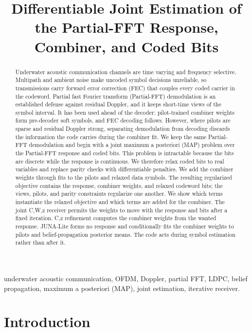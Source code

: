 \documentclass[conference]{IEEEtran}
\title{Differentiable Joint Estimation of the Partial-FFT Response,
Combiner, and Coded Bits}
\author{\IEEEauthorblockN{Gabriel Chua Yu Han}}
\begin{document}
\maketitle

\begin{abstract}
Underwater acoustic communication channels are time varying and frequency
selective.  Multipath and ambient noise make uncoded symbol decisions
unreliable, so transmissions carry forward error correction (FEC) that
couples every coded carrier in the codeword.  Partial fast Fourier transform
(Partial-FFT) demodulation is an established defense against residual Doppler,
and it keeps short-time views of the symbol interval.  It has been used
ahead of the decoder: pilot-trained combiner weights form pre-decoder soft
symbols, and FEC decoding follows.  However, where
pilots are sparse and residual Doppler strong, separating demodulation from
decoding discards the information the code carries during the combiner fit.
We keep the same Partial-FFT demodulation and begin with a joint maximum a
posteriori (MAP) problem over the Partial-FFT response and coded bits.  This
problem is intractable because the bits are discrete while the response is
continuous.  We therefore relax coded bits to real variables and replace
parity checks with differentiable penalties.  We add the combiner weights
through fits to the pilots and relaxed data symbols.  The resulting regularized
objective contains the response, combiner weights, and relaxed codeword bits;
the views, pilots, and parity constraints regularize one another.  We show
which terms instantiate the relaxed objective and which terms are added for
the combiner.  The joint C,W,z receiver permits the weights to move with the
response and bits after a fixed iteration.  C,z refinement computes the
combiner weights from the wanted response.  JUNA-Lite forms no response and
conditionally fits the combiner weights to pilots and belief-propagation
posterior means.  The code acts during symbol estimation rather than after it.
\end{abstract}

\begin{IEEEkeywords}
underwater acoustic communication, OFDM, Doppler, partial FFT, LDPC, belief
propagation, maximum a posteriori (MAP), joint estimation, iterative
receiver.
\end{IEEEkeywords}

\section{Introduction}
\end{document}
